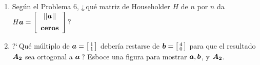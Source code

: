 \documentclass[12pt,a4paper]{article}
\newcommand{\bi}[1]{\hbox{\boldmath$#1$}}
\newcommand\1{\mbox{\,\vrule height-0.8pt depth1.0pt width2pc\,}}
\newcommand\2{\mbox{\,\vrule height-0.8pt depth1.0pt width1pc\,}}
\begin{document}
\begin{enumerate}
\vspace{-9pt}
\item Según el Problema $6$, ¿\,qué matriz de Householder $H$ de $n$ por $n$ da $H\bi{a}=\left[\begin{array}{c}||\bi{a}||\\[5pt] \textbf{ceros}\\\end{array}\right]\,?$

\item ?`\,Qué múltiplo de $\bi{a}=\bigl[\begin{smallmatrix} 1\\
    1\end{smallmatrix}\bigr]$ debería restarse de
  $\bi{b}=\bigl[\begin{smallmatrix} 4\\ 0\end{smallmatrix}\bigr]$
  para que el resultado $\bi{A_2}$ sea ortogonal a $\bi{a}$\,?
  Esboce una figura para mostrar $\bi{a}, \bi{b}$, y $\bi{A_2}$.


\end{enumerate}
\end{document}
